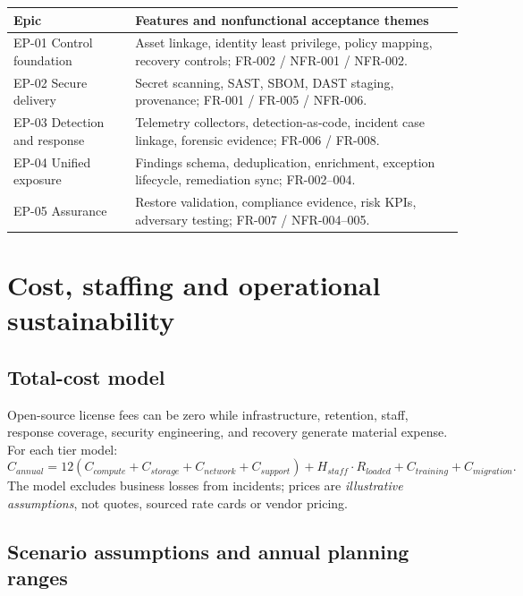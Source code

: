 \documentclass[11pt,oneside]{report}
\begin{document}
\noindent\begin{tabularx}{\textwidth}{P{0.24\textwidth}Y}
\toprule Epic & Features and nonfunctional acceptance themes\\\midrule
EP-01 Control foundation & Asset linkage, identity least privilege, policy mapping, recovery controls; FR-002 / NFR-001 / NFR-002.\\
EP-02 Secure delivery & Secret scanning, SAST, SBOM, DAST staging, provenance; FR-001 / FR-005 / NFR-006.\\
EP-03 Detection and response & Telemetry collectors, detection-as-code, incident case linkage, forensic evidence; FR-006 / FR-008.\\
EP-04 Unified exposure & Findings schema, deduplication, enrichment, exception lifecycle, remediation sync; FR-002--004.\\
EP-05 Assurance & Restore validation, compliance evidence, risk KPIs, adversary testing; FR-007 / NFR-004--005.\\
\bottomrule
\end{tabularx}

\chapter{Cost, staffing and operational sustainability}
\section{Total-cost model}
Open-source license fees can be zero while infrastructure, retention, staff, response coverage, security engineering, and recovery generate material expense. For each tier model:
\[
C_{annual}=12(C_{compute}+C_{storage}+C_{network}+C_{support})
 + H_{staff}\cdot R_{loaded}+C_{training}+C_{migration}.
\]
The model excludes business losses from incidents; prices are \emph{illustrative assumptions}, not quotes, sourced rate cards or vendor pricing.

\section{Scenario assumptions and annual planning ranges}
\end{document}
